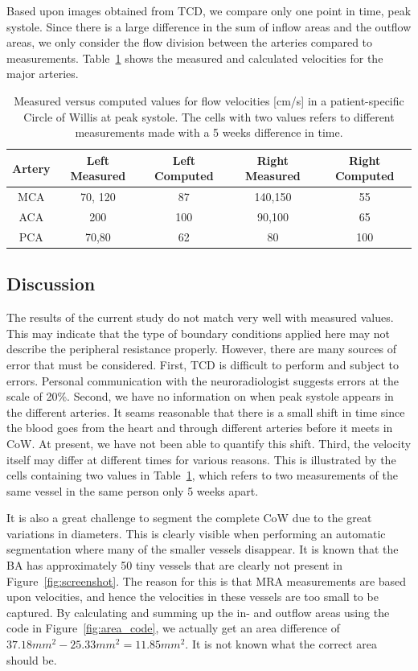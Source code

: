 Based upon images obtained from TCD, we compare only one point in
time, peak systole. Since there is a large difference in the sum of
inflow areas and the outflow areas, we only consider the flow division
between the arteries compared to measurements.
Table~\ref{measure_vs_comp} shows the measured and calculated
velocities for the major arteries.

\begin{table}
  \begin{tabular}  {  c | c | c | c | c }
    Artery & Left Measured & Left Computed & Right Measured & Right Computed \\
    \hline
    MCA & 70, 120 		& 87  & 140,150 	& 55	\\
    ACA & 200  		& 100  	& 90,100 	& 65	\\
    PCA & 70,80  		& 62 	& 80  		& 100  \\
    \hline
  \end{tabular}
  \caption{Measured versus computed values for flow velocities [cm/s]
    in a patient-specific Circle of Willis at peak systole. The cells
    with two values refers to different measurements made with a 5
    weeks difference in time.}
  \label{measure_vs_comp}
\end{table}

\subsection{Discussion}

The results of the current study do not match very well with measured
values. This may indicate that the type of boundary conditions applied
here may not describe the peripheral resistance properly. However,
there are many sources of error that must be considered.  First, TCD
is difficult to perform and subject to errors. Personal communication
with the neuroradiologist suggests errors at the scale of 20\%.
Second, we have no information on when peak systole appears in the
different arteries. It seams reasonable that there is a small shift in
time since the blood goes from the heart and through different
arteries before it meets in CoW. At present, we have not been able to
quantify this shift. Third, the velocity itself may differ at
different times for various reasons. This is illustrated by the cells
containing two values in Table~\ref{measure_vs_comp}, which refers to
two measurements of the same vessel in the same person only 5 weeks
apart.

It is also a great challenge to segment the complete CoW due to the
great variations in diameters. This is clearly visible when performing
an automatic segmentation where many of the smaller vessels disappear.
It is known that the BA has approximately 50 tiny vessels that are
clearly not present in Figure~\ref{fig:screenshot}. The reason for
this is that MRA measurements are based upon velocities, and hence the
velocities in these vessels are too small to be captured. By
calculating and summing up the in- and outflow areas using the code in
Figure~\ref{fig:area_code}, we actually get an area difference of
$37.18mm^2-25.33mm^2=11.85mm^2$. It is not known what the correct area
should be.

